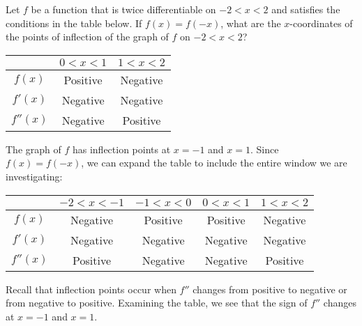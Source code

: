 \begin{Exercise} Let $f$ be a 
function that is twice differentiable on $-2 < x< 2$ and satisfies the 
conditions in the table below. If $f(x) = f(-x)$, what are the $x$-coordinates 
of the points of inflection of the graph of $f$ on $-2 < x < 2$?

\begin{tabular}{|c|c|c|}\hline
 & $0 < x < 1$ & $1 < x < 2$\\\hline
 $f(x)$ & Positive & Negative\\\hline
 $f'(x)$ & Negative & Negative\\\hline
 $f''(x)$ & Negative & Positive\\\hline
\end{tabular}
\end{Exercise}

\begin{Answer}[ref = shape3]
The graph of $f$ has inflection points at $x = -1$ and $x = 1$. Since $f(x) = 
f(-x)$, we can expand the table to include the entire window we are 
investigating:
\begin{tabular}{|c|c|c|c|c|}\hline
 & $-2 < x < -1$ & $-1 < x < 0$ & $0 < x < 1$ & $1 < x < 2$\\\hline
 $f(x)$ & Negative & Positive & Positive & Negative\\\hline
 $f'(x)$ & Negative & Negative & Negative & Negative\\\hline
 $f''(x)$ & Positive & Negative & Negative & Positive\\\hline
\end{tabular}
Recall that inflection points occur when $f''$ changes from positive to 
negative or from negative to positive. Examining the table, we see that the 
sign of $f''$ changes at $x = -1$ and $x = 1$. 
\end{Answer}
